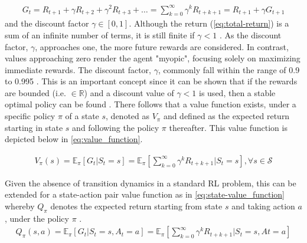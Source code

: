 \begin{equation} \label{eq:total-return}
	\begin{aligned}
		G_t  = R_{t+1} + \gamma R_{t+2} + \gamma^2 R_{t+3} + \dots = \sum_{k=0}^\infty \gamma^k R_{t+k+1} = R_{t+1} + \gamma G_{t+1}
	\end{aligned}
\end{equation}
and the discount factor $\gamma \in [0,1]$. Although the return (\autoref{eq:total-return}) is a sum of an infinite number of terms, it is still finite if $\gamma < 1$ \cite{suttonReinforcementLearningIntroduction2014}. As the discount factor, $\gamma$, approaches one, the more future rewards are considered.  In contrast, values approaching zero render the agent "myopic", focusing solely on maximizing immediate rewards. The discount factor, $\gamma$, commonly fall within the range of 0.9 to 0.995 \cite{vandenbemdRobustDeepReinforcement}. This is an important concept since it can be shown that if the rewards are bounded (i.e. $\in \mathbb{R}$) and a discount value of $\gamma <1$ is used, then a stable optimal policy can be found \cite{bertsekasNewtonMethodReinforcement2022}. There follows that a value function exists, under a specific policy $\pi$ of a state $s$, denoted as $V_{\pi}$ and defined as the expected return starting in state $s$ and following the policy $\pi$ thereafter. This value function is depicted below in \autoref{eq:value_function}.

\begin{equation}
	\label{eq:value_function}
	\begin{aligned}
		V_{\pi}(s) =  \mathbb{E}_{\pi}\left[{G_t | S_t = s}\right] =  \mathbb{E}_{\pi} 
		\left [\sum_{k=0}^{\infty} \gamma^k R_{t+k+1} | S_t = s \right], \forall s \in \mathcal{S} 
	\end{aligned}
\end{equation}

Given the absence of transition dynamics in a standard RL problem, this can be extended for a state-action pair value function as in \autoref{eq:state-value_function} whereby $Q_{\pi}$ denotes the expected return starting from state $s$ and taking action $a$, under the policy $\pi$ \cite{ajagekarDeepReinforcementLearning2022}.
\begin{equation}
	\begin{aligned}
		Q_{\pi}(s,a) =  \mathbb{E}_{\pi}\left[{G_t | S_t = s, A_t = a}\right] =  \mathbb{E}_{\pi}\left[\sum_{k=0}^{\infty} \gamma^k R_{t+k+1} | S_t = s, At = a\right]
	\end{aligned}
	\label{eq:state-value_function}
\end{equation}


